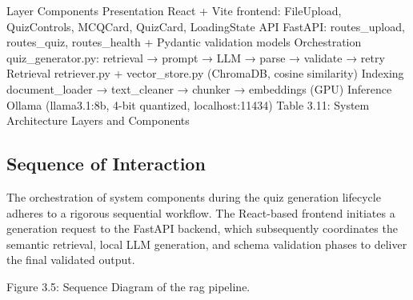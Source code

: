 \documentclass[12pt,a4paper]{report}
\begin{document}
Layer
Components
Presentation
React + Vite frontend: FileUpload, QuizControls, MCQCard, QuizCard, LoadingState
API
FastAPI: routes\_upload, routes\_quiz, routes\_health + Pydantic validation models
Orchestration
quiz\_generator.py: retrieval → prompt → LLM → parse → validate → retry
Retrieval
retriever.py + vector\_store.py (ChromaDB, cosine similarity)
Indexing
document\_loader → text\_cleaner → chunker → embeddings (GPU)
Inference
Ollama (llama3.1:8b, 4-bit quantized, localhost:11434)
Table 3.11: System Architecture Layers and Components
\subsection{Sequence of Interaction}
The orchestration of system components during the quiz generation lifecycle adheres to a rigorous sequential workflow. The React-based frontend initiates a generation request to the FastAPI backend, which subsequently coordinates the semantic retrieval, local LLM generation, and schema validation phases to deliver the final validated output.


Figure 3.5: Sequence Diagram of the rag pipeline.
\end{document}
